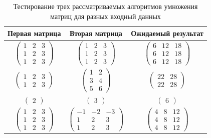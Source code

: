 \documentclass[12pt]{report}
\begin{document}
	\begin{table}[h!]
		\begin{center}
			\caption{\label{tbl:test} Тестирование трех рассматриваемых алгоритмов умножения матриц для разных входный данных}
			\begin{tabular}{|c|c|c|}
				\hline
				Первая матрица & Вторая матрица & Ожидаемый результат \\ 
				\hline
			$\begin{pmatrix}
			1 & 2 & 3\\
			1 & 2 & 3\\
			1 & 2 & 3
			\end{pmatrix}$ &
			$\begin{pmatrix}
			1 & 2 & 3\\
			1 & 2 & 3\\
			1 & 2 & 3
			\end{pmatrix}$ &
			$\begin{pmatrix}
			6 & 12 & 18\\
			6 & 12 & 18\\
			6 & 12 & 18
			\end{pmatrix}$ \\\hline
			$\begin{pmatrix}
			1 & 2 & 3\\
			1 & 2 & 3
			\end{pmatrix}$ &
			$\begin{pmatrix}
			1 & 2\\
			3 & 4\\
			5 & 6
			\end{pmatrix}$ &
			$\begin{pmatrix}
			22 & 28\\
			22 & 28
			\end{pmatrix}$ \\\hline
			$\begin{pmatrix}
			2
			\end{pmatrix}$ &
			$\begin{pmatrix}
			3
			\end{pmatrix}$ &
			$\begin{pmatrix}
			6
			\end{pmatrix}$ \\\hline
			$\begin{pmatrix}
			1 & 2 & 3\\
			1 & 2 & 3\\
			1 & 2 & 3
			\end{pmatrix}$ &
			$\begin{pmatrix}
			-1 & -2 & -3\\
			1 & 2 & 3\\
			1 & 2 & 3
			\end{pmatrix}$ &
			$\begin{pmatrix}
			4 & 8 & 12\\
			4 & 8 & 12\\
			4 & 8 & 12
			\end{pmatrix}$\\\hline
			\end{tabular}			
		\end{center}
	\end{table}
\end{document}
